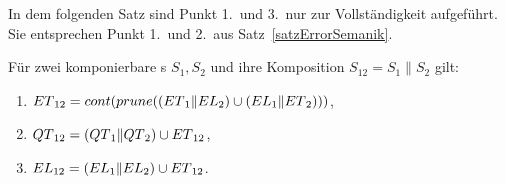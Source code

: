 In dem folgenden Satz sind Punkt 1.\ und 3.\ nur zur Vollständigkeit aufgeführt.
Sie entsprechen Punkt 1.\ und 2.\ aus Satz~\ref{satzErrorSemanik}.

\begin{satz}
  \label{satzQuiSemantik}
  Für zwei komponierbare \EIO{}s $S_1, S_2$ und ihre Komposition $S_{12} =
  S_1\|S_2$ gilt:
  \begin{enumerate}
    \item $ET{}_{12} = cont{}(prune{}((ET{}_1\|EL{}_2)\cup (EL{}_1\|ET{}_2)))$,
    \item $QT{}_{12} = (QT{}_1\|QT{}_2)\cup ET{}_{12}$,
    \item $EL{}_{12} = (EL{}_1\|EL{}_2)\cup ET{}_{12}$.
  \end{enumerate}
\end{satz}

